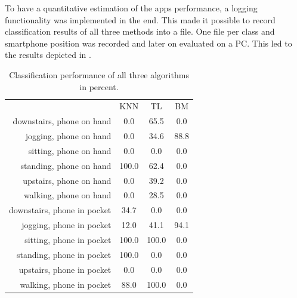 To have a quantitative estimation of the apps performance, a logging functionality was implemented in the end. This made it possible to record classification results of all three methods into a file. One file per class and smartphone position was recorded and later on evaluated on a PC. This led to the results depicted in .
\begin{table}
\centering
\begin{tabular}[htpb]{rSSS}
                             & {KNN} & {TL} & {BM} \\
downstairs, phone on hand & 0.0 & 65.5 & 0.0 \\
jogging, phone on hand & 0.0 & 34.6 & 88.8 \\
sitting, phone on hand & 0.0 & 0.0 & 0.0 \\
standing, phone on hand & 100.0 & 62.4 & 0.0 \\
upstairs, phone on hand & 0.0 & 39.2 & 0.0 \\
walking, phone on hand & 0.0 & 28.5 & 0.0 \\
downstairs, phone in pocket & 34.7 & 0.0 & 0.0 \\
jogging, phone in pocket & 12.0 & 41.1 & 94.1 \\
sitting, phone in pocket & 100.0 & 100.0 & 0.0 \\
standing, phone in pocket & 100.0 & 0.0 & 0.0 \\
upstairs, phone in pocket & 0.0 & 0.0 & 0.0 \\
walking, phone in pocket & 88.0 & 100.0 & 0.0 \\
\end{tabular}
\caption{Classification performance of all three algorithms in percent.}
\label{tab:classPerf}
\end{table}